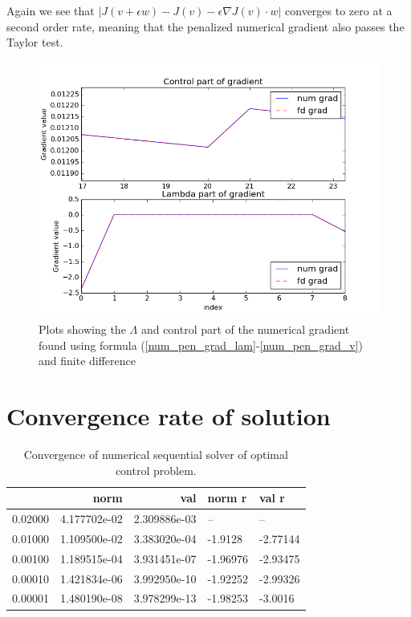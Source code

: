 \\
\\
Again we see that $|J(v+\epsilon w)-J(v)-\epsilon \nabla J(v)\cdot w|$ converges to zero at a second order rate, meaning that the penalized numerical gradient also passes the Taylor test.
\begin{figure}[h]
\caption{Plots showing the $\Lambda$ and control part of the numerical gradient found using formula (\ref{num_pen_grad_lam}-\ref{num_pen_grad_v}) and finite difference}
\centering
\includegraphics[scale=0.5]{pen_num_grad.png}
\end{figure}
\section{Convergence rate of solution}
\begin{table}[h]
\label{CN_convergence}
\caption{Convergence of numerical sequential solver of optimal control problem.}
\centering
\begin{tabular}{lrrll}
\toprule
{} &          norm &           val &   norm r &    val r \\
\midrule
\midrule
0.02000 &  4.177702e-02 &  2.309886e-03 &       -- &       -- \\
0.01000 &  1.109500e-02 &  3.383020e-04 &  -1.9128 & -2.77144 \\
0.00100 &  1.189515e-04 &  3.931451e-07 & -1.96976 & -2.93475 \\
0.00010 &  1.421834e-06 &  3.992950e-10 & -1.92252 & -2.99326 \\
0.00001 &  1.480190e-08 &  3.978299e-13 & -1.98253 &  -3.0016 \\
\bottomrule
\end{tabular}
\end{table}
